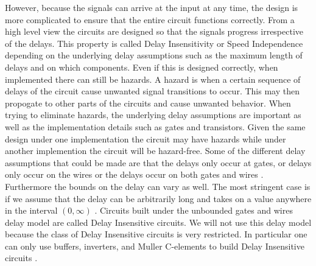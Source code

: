 \documentclass[12pt]{report}
\begin{document}

However, because the signals can arrive at the input at any time, the design is more complicated to ensure that the entire circuit functions correctly.  From a high level view the circuits are designed so that the signals progress irrespective of the delays.  This property is called Delay Insensitivity or Speed Independence depending on the underlying delay assumptions such as the maximum length of delays and on which components.  Even if this is designed correctly, when implemented there can still be hazards.  A hazard is when a certain sequence of delays of the circuit cause unwanted signal transitions to occur.  This may then propogate to other parts of the circuits and cause unwanted behavior.  When trying to eliminate hazards, the underlying delay assumptions are important as well as the implementation details such as gates and transistors. Given the same design under one implementation the circuit may have hazards while under another implemention the circuit will be hazard-free.  Some of the different delay assumptions that could be made are that the delays only occur at gates, or delays only occur on the wires or the delays occur on both gates and wires \cite{myers_book_2004}. Furthermore the bounds on the delay can vary as well. The most stringent case is if we assume that the delay can be arbitrarily long and takes on a value anywhere in the interval $(0,\infty)$ \cite{myers_book_2004}.  Circuits built under the unbounded gates and wires delay model are called Delay Insensitive circuits.  We will not use this delay model because the class of Delay Insensitive circuits is very restricted.  In particular one can only use buffers, inverters, and Muller C-elements to build Delay Insensitive circuits \cite{Martin_1990_DI} \cite{Martin1986_DI}.\\ %
\end{document}
